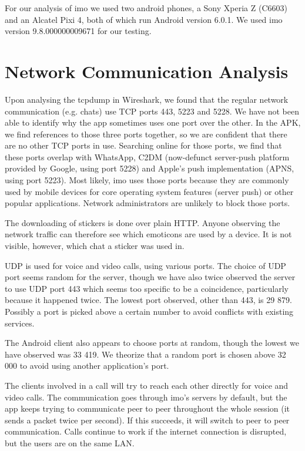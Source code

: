 \documentclass[conference]{IEEEtran}
\begin{document}
For our analysis of imo we used two android phones, a Sony Xperia Z (C6603) and
an Alcatel Pixi 4, both of which run Android version 6.0.1. We used imo
version 9.8.000000009671 for our testing.

\section{Network Communication Analysis}\label{sec:network}

Upon analysing the tcpdump in Wireshark, we found that the regular network
communication (e.g. chats) use TCP ports 443, 5223 and 5228. We have not been
able to identify why the app sometimes uses one port over the other. In the APK,
we find references to those three ports together, so we are confident that there
are no other TCP ports in use.  Searching online for those ports, we find that
these ports overlap with WhatsApp, C2DM (now-defunct server-push platform
provided by Google, using port 5228) and Apple's push implementation (APNS,
using port 5223). Most likely, imo uses those ports because they are commonly
used by mobile devices for core operating system features (server push) or other
popular applications. Network administrators are unlikely to block those ports.

The downloading of stickers is done over plain HTTP. Anyone observing the
network traffic can therefore see which emoticons are used by a device. It is
not visible, however, which chat a sticker was used in.

UDP is used for voice and video calls, using various ports. The choice of UDP
port seems random for the server, though we have also twice observed the server
to use UDP port 443 which seems too specific to be a coincidence, particularly
because it happened twice. The lowest port observed, other than 443, is 29 879.
Possibly a port is picked above a certain number to avoid conflicts with
existing services.

The Android client also appears to choose ports at random, though the lowest we
have observed was 33 419. We theorize that a random port is chosen above 32 000
to avoid using another application's port.

The clients involved in a call will try to reach each other directly for voice
and video calls. The communication goes through imo's servers by default, but
the app keeps trying to communicate peer to peer throughout the whole session
(it sends a packet twice per second). If this succeeds, it will switch to peer
to peer communication. Calls continue to work if the internet connection is
disrupted, but the users are on the same LAN.
\end{document}
